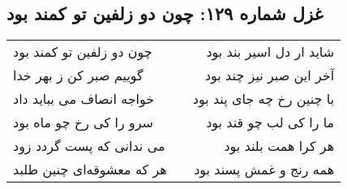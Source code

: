 \begin{center}
\section*{غزل شماره ۱۲۹: چون دو زلفین تو کمند بود}
\label{sec:129}
\begin{longtable}{l p{0.5cm} r}
چون دو زلفین تو کمند بود
&&
شاید ار دل اسیر بند بود
\\
گوییم صبر کن ز بهر خدا
&&
آخر این صبر نیز چند بود
\\
خواجه انصاف می بباید داد
&&
با چنین رخ چه جای پند بود
\\
سرو را کی رخ چو ماه بود
&&
ما را کی لب چو قند بود
\\
می ندانی که پست گردد زود
&&
هر کرا همت بلند بود
\\
هر که معشوقه‌ای چنین طلبد
&&
همه رنج و غمش پسند بود
\\
\end{longtable}
\end{center}

